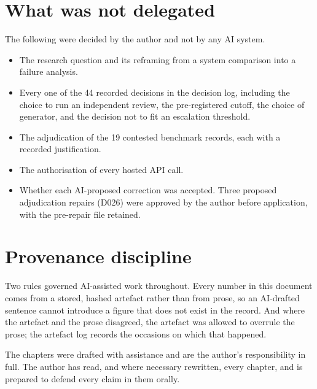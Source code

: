 \section{What was not delegated}

The following were decided by the author and not by any AI system.

\begin{itemize}
  \item The research question and its reframing from a system comparison into a
    failure analysis.
  \item Every one of the 44 recorded decisions in the decision log, including
    the choice to run an independent review, the pre-registered cutoff, the
    choice of generator, and the decision not to fit an escalation threshold.
  \item The adjudication of the 19 contested benchmark records, each with a
    recorded justification.
  \item The authorisation of every hosted API call.
  \item Whether each AI-proposed correction was accepted. Three proposed
    adjudication repairs (D026) were approved by the author before application,
    with the pre-repair file retained.
\end{itemize}

\section{Provenance discipline}

Two rules governed AI-assisted work throughout. Every number in this document
comes from a stored, hashed artefact rather than from prose, so an AI-drafted
sentence cannot introduce a figure that does not exist in the record. And where
the artefact and the prose disagreed, the artefact was allowed to overrule the
prose; the artefact log records the occasions on which that happened.

The chapters were drafted with assistance and are the author's responsibility in
full. The author has read, and where necessary rewritten, every chapter, and is
prepared to defend every claim in them orally.
